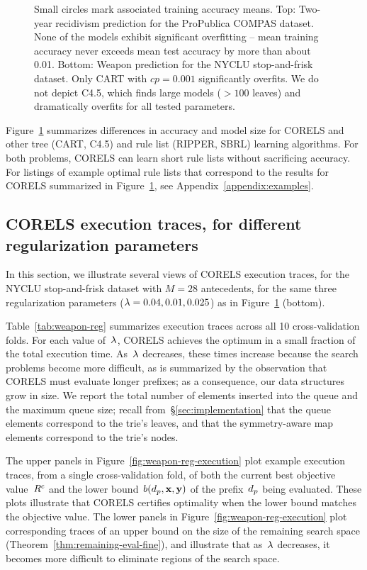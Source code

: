 \begin{figure}[t!]
{%
Small circles mark associated training accuracy means.
%
Top:  Two-year recidivism prediction for the ProPublica COMPAS dataset.
%
%
None of the models exhibit significant overfitting --
mean training accuracy never exceeds mean test accuracy
by more than about 0.01.
%
Bottom:  Weapon prediction for the NYCLU stop-and-frisk dataset.
%
%
Only CART with ${cp = 0.001}$ significantly overfits.
%
We do not depict C4.5, which finds large models (${>100}$ leaves)
and dramatically overfits for all tested parameters.
}
\label{fig:sparsity}
\end{figure}

Figure~\ref{fig:sparsity} summarizes differences in accuracy and model size
for CORELS and other tree (CART, C4.5) and rule list (RIPPER, SBRL) learning algorithms.
%
For both problems, CORELS can learn short rule lists without sacrificing accuracy.
%
For listings of example optimal rule lists that correspond to the results
for CORELS summarized in Figure~\ref{fig:sparsity}, see Appendix~\ref{appendix:examples}.

\subsection{CORELS execution traces, for different regularization parameters}
\label{sec:reg-param}

In this section, we illustrate several views of CORELS execution traces,
for the NYCLU stop-and-frisk dataset with ${M = 28}$ antecedents,
for the same three regularization parameters (${{\lambda} = 0.04, 0.01, 0.025}$)
as in Figure~\ref{fig:sparsity} (bottom).

Table~\ref{tab:weapon-reg} summarizes execution traces across all 10 cross-validation folds.
%
For each value of~${\lambda}$, CORELS achieves the optimum in a small fraction of the total execution time.
%
As~${\lambda}$ decreases, these times increase because the search problems become more difficult,
as is summarized by the observation that CORELS must evaluate longer prefixes;
as a consequence, our data structures grow in size.
%
We report the total number of elements inserted into the queue and the maximum queue size;
recall from~\S\ref{sec:implementation} that the queue elements correspond to the trie's leaves,
and that the symmetry-aware map elements correspond to the trie's nodes.

The upper panels in Figure~\ref{fig:weapon-reg-execution} plot example execution traces,
from a single cross-validation fold, of both the current best objective value~${R^c}$
and the lower bound~$b(d_p, \mathbf{x}, \mathbf{y})$ of the prefix~$d_p$ being evaluated.
%
These plots illustrate that CORELS certifies optimality
when the lower bound matches the objective value.
%
The lower panels in Figure~\ref{fig:weapon-reg-execution} plot corresponding traces of
an upper bound on the size of the remaining search space (Theorem~\ref{thm:remaining-eval-fine}),
and illustrate that as~${\lambda}$ decreases, it becomes more difficult to eliminate regions of the search space.

